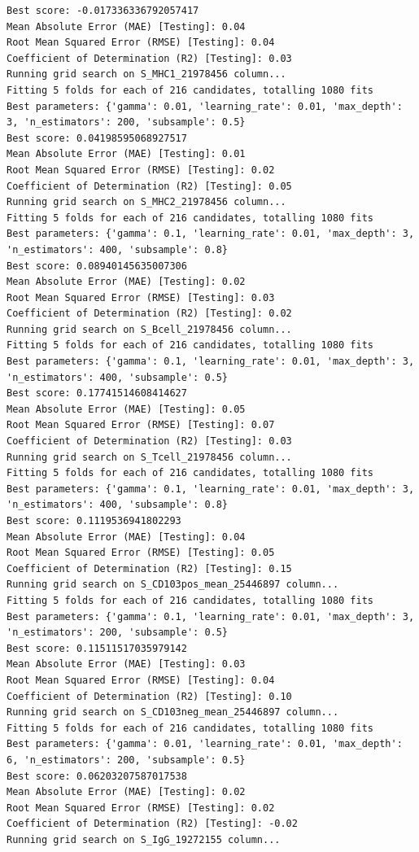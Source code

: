 \documentclass[
  letterpaper,
  DIV=11,
  numbers=noendperiod]{scrartcl}
\begin{document}
\begin{verbatim}
Best score: -0.017336336792057417
Mean Absolute Error (MAE) [Testing]: 0.04
Root Mean Squared Error (RMSE) [Testing]: 0.04
Coefficient of Determination (R2) [Testing]: 0.03
Running grid search on S_MHC1_21978456 column...
Fitting 5 folds for each of 216 candidates, totalling 1080 fits
Best parameters: {'gamma': 0.01, 'learning_rate': 0.01, 'max_depth': 3, 'n_estimators': 200, 'subsample': 0.5}
Best score: 0.04198595068927517
Mean Absolute Error (MAE) [Testing]: 0.01
Root Mean Squared Error (RMSE) [Testing]: 0.02
Coefficient of Determination (R2) [Testing]: 0.05
Running grid search on S_MHC2_21978456 column...
Fitting 5 folds for each of 216 candidates, totalling 1080 fits
Best parameters: {'gamma': 0.1, 'learning_rate': 0.01, 'max_depth': 3, 'n_estimators': 400, 'subsample': 0.8}
Best score: 0.08940145635007306
Mean Absolute Error (MAE) [Testing]: 0.02
Root Mean Squared Error (RMSE) [Testing]: 0.03
Coefficient of Determination (R2) [Testing]: 0.02
Running grid search on S_Bcell_21978456 column...
Fitting 5 folds for each of 216 candidates, totalling 1080 fits
Best parameters: {'gamma': 0.1, 'learning_rate': 0.01, 'max_depth': 3, 'n_estimators': 400, 'subsample': 0.5}
Best score: 0.17741514608414627
Mean Absolute Error (MAE) [Testing]: 0.05
Root Mean Squared Error (RMSE) [Testing]: 0.07
Coefficient of Determination (R2) [Testing]: 0.03
Running grid search on S_Tcell_21978456 column...
Fitting 5 folds for each of 216 candidates, totalling 1080 fits
Best parameters: {'gamma': 0.1, 'learning_rate': 0.01, 'max_depth': 3, 'n_estimators': 400, 'subsample': 0.8}
Best score: 0.1119536941802293
Mean Absolute Error (MAE) [Testing]: 0.04
Root Mean Squared Error (RMSE) [Testing]: 0.05
Coefficient of Determination (R2) [Testing]: 0.15
Running grid search on S_CD103pos_mean_25446897 column...
Fitting 5 folds for each of 216 candidates, totalling 1080 fits
Best parameters: {'gamma': 0.1, 'learning_rate': 0.01, 'max_depth': 3, 'n_estimators': 200, 'subsample': 0.5}
Best score: 0.11511517035979142
Mean Absolute Error (MAE) [Testing]: 0.03
Root Mean Squared Error (RMSE) [Testing]: 0.04
Coefficient of Determination (R2) [Testing]: 0.10
Running grid search on S_CD103neg_mean_25446897 column...
Fitting 5 folds for each of 216 candidates, totalling 1080 fits
Best parameters: {'gamma': 0.01, 'learning_rate': 0.01, 'max_depth': 6, 'n_estimators': 200, 'subsample': 0.5}
Best score: 0.06203207587017538
Mean Absolute Error (MAE) [Testing]: 0.02
Root Mean Squared Error (RMSE) [Testing]: 0.02
Coefficient of Determination (R2) [Testing]: -0.02
Running grid search on S_IgG_19272155 column...

\end{verbatim}
\end{document}
